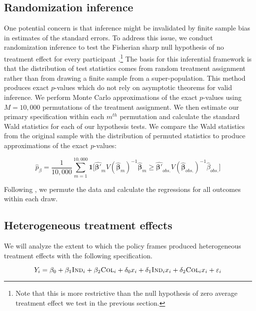 \documentclass[11pt, a4paper]{article}\usepackage[]{graphicx}\usepackage[]{color}
\begin{document}
    \subsection{Randomization inference}

        One potential concern is that inference might be invalidated by finite sample bias in estimates of the standard errors. To address this issue, we conduct randomization inference to test the Fisherian sharp null hypothesis of no treatment effect for every participant \parencite{fisher_design_1935}.\footnote{Note that this is more restrictive than the null hypothesis of zero average treatment effect we test in the previous section.} The basis for this inferential framework is that the distribution of test statistics comes from random treatment assignment rather than from drawing a finite sample from a super-population. This method produces exact $p$-values which do not rely on asymptotic theorems for valid inference. We perform Monte Carlo approximations of the exact $p$-values using $M=10,000$ permutations of the treatment assignment. We then estimate our primary specification within each $m^{th}$ permutation and calculate the standard Wald statistics for each of our hypothesis tests. We compare the Wald statistics from the original sample with the distribution of permuted statistics to produce approximations of the exact $p$-values:

        \begin{equation} \label{eq:exactp}
            \hat{p}_{\beta} =  \frac{1}{10,000}\sum_{m=1}^{10,000} \mathbf{1} \Big [ \mathbf{\hat{\beta'}}_m V(\mathbf{\hat{\beta}}_m)^{-1} \mathbf{\hat{\beta}}_m \geq \mathbf{\hat{\beta'}}_{obs.} V(\mathbf{\hat{\beta}}_{obs.})^{-1} \hat{\beta}_{obs.} \Big ]
        \end{equation}

        Following \textcite{young_channeling_2015}, we permute the data and calculate the regressions for all outcomes within each draw.

    \subsection{Heterogeneous treatment effects}

        We will analyze the extent to which the policy frames produced heterogeneous treatment effects with the following specification.

        \begin{equation}
            Y_{i} = \beta_{0} + \beta_{1}\text{\textsc{Ind}}_{i} + \beta_{2}\text{\textsc{Col}}_{i} + \delta_{0} x_i + \delta_{1}\text{\textsc{Ind}}_{i} x_i + \delta_{2}\text{\textsc{Col}}_{i} x_i + \varepsilon_{i}
        \label{eq:heteffect} \end{equation}
\end{document}
